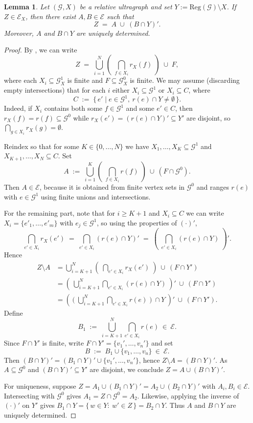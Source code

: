 \documentclass[12pt, reqno]{amsart}
\newtheorem{lemma}[theorem]{Lemma}
\theoremstyle{definition}
\theoremstyle{remark}
\numberwithin{equation}{section}
\begin{document}
\begin{lemma}\label{decomposition1}
Let $(\mathcal{G},X)$ be a relative ultragraph and set $Y:=\mathrm{Reg}(\mathcal{G})\setminus X$.
If $Z \in \mathcal{E}_X$, then there exist $A,B \in \mathcal{E}$ such that
\[
Z \;=\; A \;\cup\; (B \cap Y)'.
\]
Moreover, $A$ and $B \cap Y$ are uniquely determined.
\end{lemma}

\begin{proof}
By \cite[Lemma~2.12]{Tom2}, we can write
\[
Z \;=\; \bigcup_{i=1}^N \left(\;\bigcap_{f \in X_i} r_X(f)\;\right) \;\cup\; F,
\]
where each $X_i \subseteq \mathcal{G}_X^1$ is finite and $F\subseteq \mathcal{G}_X^0$ is finite.
We may assume (discarding empty intersections) that for each $i$ either
$X_i \subseteq \mathcal{G}^1$ or $X_i \subseteq C$, where
\[
C \;:=\; \{\, e' \mid e \in \mathcal{G}^1,\ r(e)\cap Y \neq \emptyset \,\}.
\]
Indeed, if $X_i$ contains both some $f\in\mathcal{G}^1$ and some $e'\in C$, then
$r_X(f)=r(f)\subseteq \mathcal{G}^0$ while $r_X(e')=(r(e)\cap Y)'\subseteq Y'$ are disjoint, so
$\bigcap_{g\in X_i} r_X(g)=\emptyset$.

Reindex so that for some $K\in\{0,\dots,N\}$ we have
$X_1,\dots,X_K \subseteq \mathcal{G}^1$ and $X_{K+1},\dots,X_N \subseteq C$.
Set
\[
A \;:=\; \bigcup_{i=1}^K \left(\;\bigcap_{f \in X_i} r(f)\;\right)\ \cup\ (F \cap \mathcal{G}^0).
\]
Then $A\in \mathcal{E}$, because it is obtained from finite vertex sets in $\mathcal{G}^0$ and ranges
$r(e)$ with $e\in\mathcal{G}^1$ using finite unions and intersections.

For the remaining part, note that for $i\ge K+1$ and $X_i\subseteq C$ we can write
$X_i=\{e'_1,\dots,e'_m\}$ with $e_j\in\mathcal{G}^1$, so using the properties of $(\cdot)'$,
\[
\bigcap_{e'\in X_i} r_X(e') \;=\; 
\bigcap_{e'\in X_i} (r(e)\cap Y)' \;=\;
\left(\;\bigcap_{e'\in X_i} (r(e)\cap Y)\;\right)'.
\]
Hence
\begin{align*}
Z \setminus A
&= \bigcup_{i=K+1}^N \left(\;\bigcap_{e'\in X_i} r_X(e')\;\right) \ \cup\ (F\cap Y') \\
&= \left(\ \bigcup_{i=K+1}^N \bigcap_{e'\in X_i} (r(e)\cap Y)\ \right)'\ \cup\ (F\cap Y') \\
&= \left(\ \Big(\;\bigcup_{i=K+1}^N \bigcap_{e'\in X_i} r(e)\;\Big)\ \cap Y\ \right)'\ \cup\ (F\cap Y').
\end{align*}
Define
\[
B_1 \;:=\; \bigcup_{i=K+1}^N \bigcap_{e'\in X_i} r(e) \ \in\ \mathcal{E}.
\]
Since $F\cap Y'$ is finite, write $F\cap Y'=\{v_1',\dots,v_n'\}$ and set
\[
B \;:=\; B_1 \cup \{v_1,\dots,v_n\} \ \in\ \mathcal{E}.
\]
Then $(B\cap Y)'=(B_1\cap Y)'\cup \{v_1',\dots,v_n'\}$, hence
$Z\setminus A=(B\cap Y)'$. As $A\subseteq \mathcal{G}^0$ and $(B\cap Y)'\subseteq Y'$ are
disjoint, we conclude $Z=A\cup(B\cap Y)'$.

For uniqueness, suppose $Z=A_1\cup (B_1\cap Y)'=A_2\cup (B_2\cap Y)'$ with $A_i,B_i\in\mathcal{E}$.
Intersecting with $\mathcal{G}^0$ gives $A_1=Z\cap \mathcal{G}^0=A_2$. 
Likewise, applying the inverse of $(\cdot)'$ on $Y'$ gives
$B_1\cap Y=\{\,w\in Y:\ w'\in Z\,\}=B_2\cap Y$. Thus $A$ and $B\cap Y$ are uniquely determined.
\end{proof}
\end{document}
